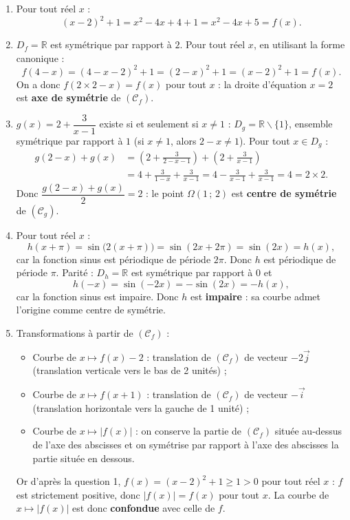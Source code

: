 \documentclass[11pt]{article}
\def\setminus{\mathbin{\backslash}}\let\smallsetminus\setminus
\begin{document}
\begin{corrige}
\begin{enumerate}
\item Pour tout réel $x$ :
\[ (x-2)^2+1=x^2-4x+4+1=x^2-4x+5=f(x). \]
\item $D_f=\mathbb{R}$ est symétrique par rapport à $2$. Pour tout réel $x$, en utilisant la forme canonique :
\[ f(4-x)=(4-x-2)^2+1=(2-x)^2+1=(x-2)^2+1=f(x). \]
On a donc $f(2\times 2-x)=f(x)$ pour tout $x$ : la droite d'équation $x=2$ est \textbf{axe de symétrie} de $(\mathcal{C}_f)$.
\item $g(x)=2+\dfrac{3}{x-1}$ existe si et seulement si $x\neq 1$ : $D_g=\mathbb{R}\setminus\{1\}$, ensemble symétrique par rapport à $1$ (si $x\neq 1$, alors $2-x\neq 1$). Pour tout $x\in D_g$ :
\begin{align*}
g(2-x)+g(x)&=\left(2+\frac{3}{2-x-1}\right)+\left(2+\frac{3}{x-1}\right)\\
&=4+\frac{3}{1-x}+\frac{3}{x-1}=4-\frac{3}{x-1}+\frac{3}{x-1}=4=2\times 2.
\end{align*}
Donc $\dfrac{g(2-x)+g(x)}{2}=2$ : le point $\Omega(1\,;\,2)$ est \textbf{centre de symétrie} de $(\mathcal{C}_g)$.
\item Pour tout réel $x$ :
\[ h(x+\pi)=\sin\bigl(2(x+\pi)\bigr)=\sin(2x+2\pi)=\sin(2x)=h(x), \]
car la fonction sinus est périodique de période $2\pi$. Donc $h$ est périodique de période $\pi$. Parité : $D_h=\mathbb{R}$ est symétrique par rapport à $0$ et
\[ h(-x)=\sin(-2x)=-\sin(2x)=-h(x), \]
car la fonction sinus est impaire. Donc $h$ est \textbf{impaire} : sa courbe admet l'origine comme centre de symétrie.
\item Transformations à partir de $(\mathcal{C}_f)$ :
\begin{itemize}
\item Courbe de $x\mapsto f(x)-2$ : translation de $(\mathcal{C}_f)$ de vecteur $-2\vec{j}$ (translation verticale vers le bas de 2 unités) ;
\item Courbe de $x\mapsto f(x+1)$ : translation de $(\mathcal{C}_f)$ de vecteur $-\vec{i}$ (translation horizontale vers la gauche de 1 unité) ;
\item Courbe de $x\mapsto |f(x)|$ : on conserve la partie de $(\mathcal{C}_f)$ située au-dessus de l'axe des abscisses et on symétrise par rapport à l'axe des abscisses la partie située en dessous.
\end{itemize}
Or d'après la question 1, $f(x)=(x-2)^2+1\geq 1>0$ pour tout réel $x$ : $f$ est strictement positive, donc $|f(x)|=f(x)$ pour tout $x$. La courbe de $x\mapsto|f(x)|$ est donc \textbf{confondue} avec celle de $f$.
\end{enumerate}
\end{corrige}
\end{document}
